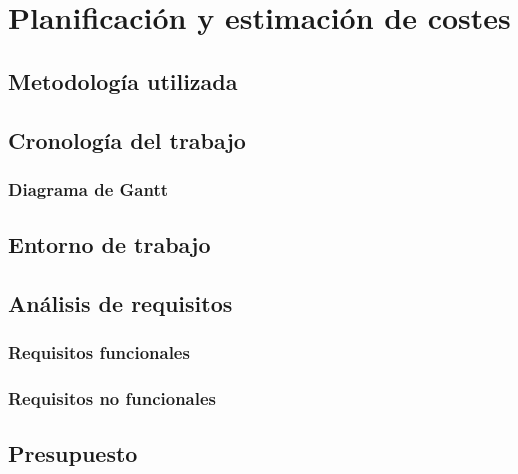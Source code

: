 \chapter{Planificación y estimación de costes}

\section{Metodología utilizada}

\section{Cronología del trabajo}
\subsection{Diagrama de Gantt}

\section{Entorno de trabajo}

\section{Análisis de requisitos}

\subsection{Requisitos funcionales}

\subsection{Requisitos no funcionales}

\section{Presupuesto}
